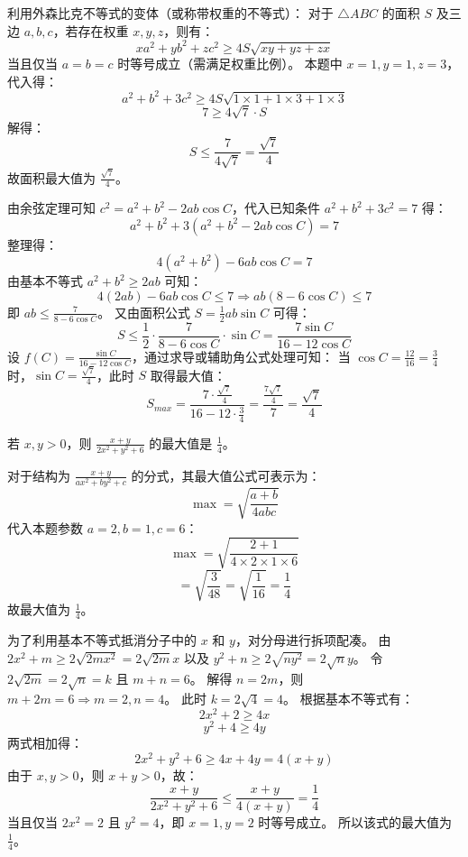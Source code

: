 \begin{questions}
\begin{solution}
利用外森比克不等式的变体（或称带权重的不等式）：
对于 $\triangle ABC$ 的面积 $S$ 及三边 $a, b, c$，若存在权重 $x, y, z$，则有：
\[
xa^2 + yb^2 + zc^2 \ge 4S\sqrt{xy+yz+zx}
\]
当且仅当 $a=b=c$ 时等号成立（需满足权重比例）。
本题中 $x=1, y=1, z=3$，代入得：
\[
a^2 + b^2 + 3c^2 \ge 4S\sqrt{1 \times 1 + 1 \times 3 + 1 \times 3}
\]
\[
7 \ge 4\sqrt{7} \cdot S
\]
解得：
\[
S \le \frac{7}{4\sqrt{7}} = \frac{\sqrt{7}}{4}
\]
故面积最大值为 $\frac{\sqrt{7}}{4}$。
\end{solution}
\begin{solution}
由余弦定理可知 $c^2 = a^2 + b^2 - 2ab \cos C$，代入已知条件 $a^2 + b^2 + 3c^2 = 7$ 得：
\[
a^2 + b^2 + 3(a^2 + b^2 - 2ab \cos C) = 7
\]
整理得：
\[
4(a^2 + b^2) - 6ab \cos C = 7
\]
由基本不等式 $a^2 + b^2 \ge 2ab$ 可知：
\[
4(2ab) - 6ab \cos C \le 7 \Rightarrow ab(8 - 6 \cos C) \le 7
\]
即 $ab \le \frac{7}{8 - 6 \cos C}$。
又由面积公式 $S = \frac{1}{2} ab \sin C$ 可得：
\[
S \le \frac{1}{2} \cdot \frac{7}{8 - 6 \cos C} \cdot \sin C = \frac{7 \sin C}{16 - 12 \cos C}
\]
设 $f(C) = \frac{\sin C}{16 - 12 \cos C}$，通过求导或辅助角公式处理可知：
当 $\cos C = \frac{12}{16} = \frac{3}{4}$ 时，$\sin C = \frac{\sqrt{7}}{4}$，此时 $S$ 取得最大值：
\[
S_{max} = \frac{7 \cdot \frac{\sqrt{7}}{4}}{16 - 12 \cdot \frac{3}{4}} = \frac{\frac{7\sqrt{7}}{4}}{7} = \frac{\sqrt{7}}{4}
\]
\end{solution}

\question 若 $x,y > 0$，则 $\frac{x+y}{2x^2 + y^2 + 6}$ 的最大值是 $\frac{1}{4}$。

\begin{solution}
对于结构为 $\frac{x+y}{ax^2 + by^2 + c}$ 的分式，其最大值公式可表示为：
\[
\max = \sqrt{\frac{a+b}{4abc}}
\]
代入本题参数 $a=2, b=1, c=6$：
\[
\max = \sqrt{\frac{2+1}{4 \times 2 \times 1 \times 6}}
\]
\[
= \sqrt{\frac{3}{48}} = \sqrt{\frac{1}{16}} = \frac{1}{4}
\]
故最大值为 $\frac{1}{4}$。
\end{solution}
\begin{solution}
为了利用基本不等式抵消分子中的 $x$ 和 $y$，对分母进行拆项配凑。
由 $2x^2 + m \ge 2\sqrt{2mx^2} = 2\sqrt{2m}x$ 以及 $y^2 + n \ge 2\sqrt{ny^2} = 2\sqrt{n}y$。
令 $2\sqrt{2m} = 2\sqrt{n} = k$ 且 $m+n=6$。
解得 $n = 2m$，则 $m + 2m = 6 \Rightarrow m=2, n=4$。
此时 $k = 2\sqrt{4} = 4$。
根据基本不等式有：
\[
2x^2 + 2 \ge 4x
\]
\[
y^2 + 4 \ge 4y
\]
两式相加得：
\[
2x^2 + y^2 + 6 \ge 4x + 4y = 4(x+y)
\]
由于 $x,y > 0$，则 $x+y > 0$，故：
\[
\frac{x+y}{2x^2 + y^2 + 6} \le \frac{x+y}{4(x+y)} = \frac{1}{4}
\]
当且仅当 $2x^2 = 2$ 且 $y^2 = 4$，即 $x=1, y=2$ 时等号成立。
所以该式的最大值为 $\frac{1}{4}$。
\end{solution}


\end{questions}
